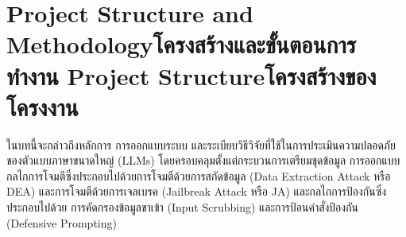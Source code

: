 \chapter{\ifproject%
\ifenglish Project Structure and Methodology\else โครงสร้างและขั้นตอนการทำงาน\fi
\else%
\ifenglish Project Structure\else โครงสร้างของโครงงาน\fi
\fi
}

ในบทนี้จะกล่าวถึงหลักการ การออกแบบระบบ และระเบียบวิธีวิจัยที่ใช้ในการประเมินความปลอดภัยของตัวแบบภาษาขนาดใหญ่ (LLMs) 
โดยครอบคลุมตั้งแต่กระบวนการเตรียมชุดข้อมูล การออกแบบกลไกการโจมตีซึ่งประกอบไปด้วยการโจมตีด้วยการสกัดข้อมูล (Data Extraction Attack หรือ DEA) 
และการโจมตีด้วยการเจลเบรค (Jailbreak Attack หรือ JA) และกลไกการป้องกันซึ่งประกอบไปด้วย การคัดกรองข้อมูลขาเข้า (Input Scrubbing) และการป้อนคำสั่งป้องกัน (Defensive Prompting) 

\makeatletter


\makeatother

